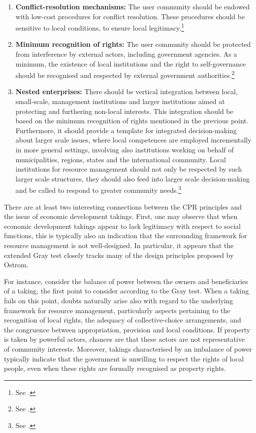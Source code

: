 \begin{enumerate}
\item {\bf Conflict-resolution mechanisms:} The user community should be endowed with low-cost procedures for conflict resolution. These procedures should be sensitive to local conditions, to ensure local legitimacy.\footnote{See \cite[100-101]{ostrom90}.}
\item {\bf Minimum recognition of rights:} The user community should be protected from interference by external actors, including government agencies. As a minimum, the existence of local institutions and the right to self-governance should be recognised and respected by external government authorities.\footnote{See \cite[101]{ostrom90}.}
\item {\bf Nested enterprises:} There should be vertical integration between local, small-scale, management institutions and larger institutions aimed at protecting and furthering non-local interests. This integration should be based on the minimum recognition of rights mentioned in the previous point. Furthermore, it should provide a template for integrated decision-making about larger scale issues, where local competences are employed incrementally in more general settings, involving also institutions working on behalf of municipalities, regions, states and the international community. Local institutions for resource management should not only be respected by such larger scale structures, they should also feed into larger scale decision-making and be called to respond to greater community needs.\footnote{See \cite[101-102]{ostrom90}.}
\end{enumerate}

There are at least two interesting connections between the CPR principles and the issue of economic development takings. First, one may observe that when economic development takings appear to lack legitimacy with respect to social functions, this is typically also an indication that the surrounding framework for resource management is not well-designed. In particular, it appears that the extended Gray test closely tracks many of the design principles proposed by Ostrom.

For instance, consider the balance of power between the owners and beneficiaries of a taking, the first point to consider according to the Gray test. When a taking fails on this point, doubts naturally arise also with regard to the underlying framework for resource management, particularly aspects pertaining to the recognition of local rights, the adequacy of collective-choice arrangements, and the congruence between appropriation, provision and local conditions. If property is taken by powerful actors, chances are that these actors are not representative of community interests. Moreover, takings characterised by an imbalance of power typically indicate that the government is unwilling to respect the rights of local people, even when these rights are formally recognised as property rights.

